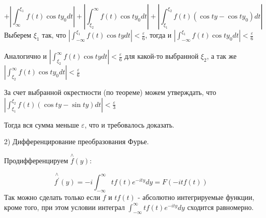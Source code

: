 \documentclass[12pt]{article}
\begin{document}
$$+ |\int_{\infty}^{\xi_1} f(t) \cos{ty_0} dt| + |\int_{\xi_2}^{\infty} f(t) \cos{ty_0} dt| + |\int_{\xi_1}^{\xi_2} f(t)(\cos{ty} - \cos{ty_0}) dt|$$
Выберем $\xi_1$ так, что $|\int_{-\infty}^{\xi_1} f(t) \cos{ty} dt| < \frac{\varepsilon}{6}$, тогда и $|\int_{-\infty}^{\xi_1} f(t)\cos{ty_0} dt| < \frac{\varepsilon}{6}$\par
Аналогично и $|\int_{\xi_2}^{\infty} f(t)\cos{ty}dt| < \frac{\varepsilon}{6}$ для какой-то выбранной $\xi_2$, а так же $|\int_{\xi_2}^{\infty} f(t)\cos{ty_0}dt| < \frac{\varepsilon}{6}$\par
За счет выбранной окрестности (по теореме) можем утверждать, что $|\int_{\xi_1}^{\xi_2} f(t)(\cos{ty}-\sin{ty})dt| < \frac{\varepsilon}{3}$\par
Тогда вся сумма меньше $\varepsilon$, что и требовалось доказать.\par
2) Дифференцирование преобразования Фурье.\par
Продифференцируем $\overset{\wedge}{f}(y)$:\par
$$\overset{\wedge}{f^{'}}(y) = -i \int_{-\infty}^{\infty} tf(t) e^{-ity} dy = F(-itf(t))$$
Так можно сделать только если $f$ и $tf(t)$ - абсолютно интегрируемые функции, кроме того, при этом условии интеграл $\int_{-\infty}^{\infty} tf(t) e^{-ity} dy$ сходится равномерно.\par
\end{document}
